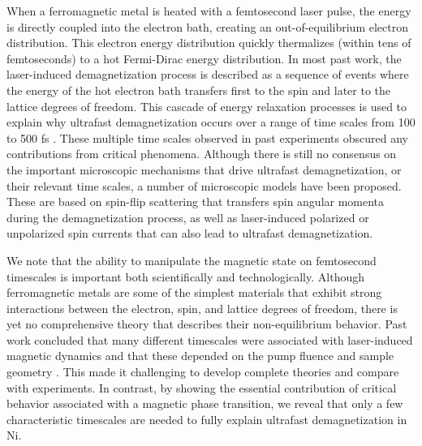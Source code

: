 When a ferromagnetic metal is heated with a femtosecond laser pulse, the energy is directly coupled into the electron bath, creating an out-of-equilibrium electron distribution. This electron energy distribution quickly thermalizes (within tens of femtoseconds) to a hot Fermi-Dirac energy distribution. In most past work, the laser-induced demagnetization process is described as a sequence of events where the energy of the hot electron bath transfers first to the spin and later to the lattice degrees of freedom. This cascade of energy relaxation processes is used to explain why ultrafast demagnetization occurs over a range of time scales from 100 to 500 fs \cite{E.BeaupaireJ-CMerleA.Daunois1996,Koopmans2010}. These multiple time scales observed in past experiments obscured any contributions from critical phenomena. Although there is still no consensus on the important microscopic mechanisms that drive ultrafast demagnetization, or their relevant time scales, a number of microscopic models have been proposed. These are based on spin-flip scattering \cite{Koopmans2010, Zhang2009,Krauß2009,Bigot2009,Carpene2015,Mueller2013} that transfers spin angular momenta during the demagnetization process, as well as laser-induced polarized \cite{La-O-Vorakiat2012,Battiato2010,Rudolf2012} or unpolarized \cite{Dakovski2016,Eschenlohr2013} spin currents that can also lead to ultrafast demagnetization.

We note that the ability to manipulate the magnetic state on femtosecond timescales is important both scientifically and technologically. Although ferromagnetic metals are some of the simplest materials that exhibit strong interactions between the electron, spin, and lattice degrees of freedom, there is yet no comprehensive theory that describes their non-equilibrium behavior. Past work concluded that many different timescales were associated with laser-induced magnetic dynamics and that these depended on the pump fluence \cite{Tows2015,Illg2013} and sample geometry \cite{Schmidt2010, Turgut2016}. This made it challenging to develop complete theories and compare with experiments. In contrast, by showing the essential contribution of critical behavior associated with a magnetic phase transition, we reveal that only a few characteristic timescales are needed to fully explain ultrafast demagnetization in Ni.